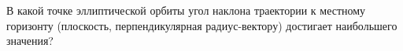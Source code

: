 В какой точке эллиптической орбиты угол наклона траектории к местному горизонту (плоскость, перпендикулярная радиус-вектору)
достигает наибольшего значения?